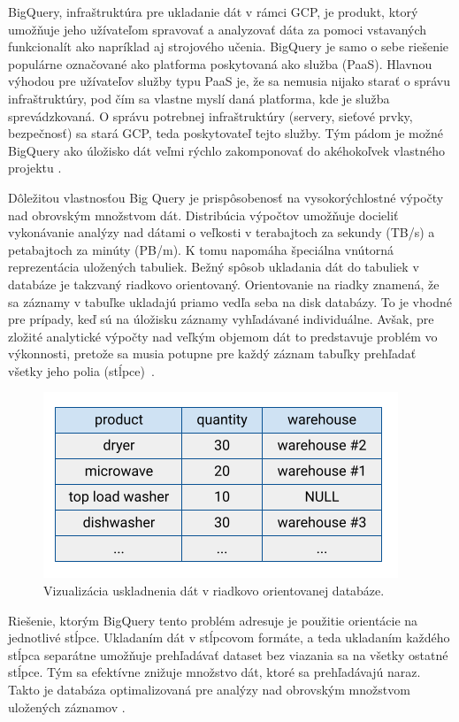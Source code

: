 BigQuery, infraštruktúra pre ukladanie dát v rámci GCP, je produkt, ktorý umožňuje jeho užívateľom spravovať a analyzovať dáta za pomoci vstavaných funkcionalít ako napríklad aj strojového učenia.
BigQuery je samo o sebe riešenie populárne označované ako platforma poskytovaná ako služba (PaaS).
Hlavnou výhodou pre užívateľov služby typu PaaS je, že sa nemusia nijako starať o správu infraštruktúry, pod čím sa vlastne myslí daná platforma, kde je služba sprevádzkovaná.
O správu potrebnej infraštruktúry (servery, sieťové prvky, bezpečnosť) sa stará GCP, teda poskytovateľ tejto služby.
Tým pádom je možné BigQuery ako úložisko dát veľmi rýchlo zakomponovať do akéhokoľvek vlastného projektu \cite{google-bq}.

Dôležitou vlastnosťou Big Query je prispôsobenosť na vysokorýchlostné výpočty nad obrovským množstvom dát.
Distribúcia výpočtov umožňuje docieliť vykonávanie analýzy nad dátami o veľkosti v terabajtoch za sekundy (TB/s) a petabajtoch za minúty (PB/m).
K tomu napomáha špeciálna vnútorná reprezentácia uložených tabuliek. 
Bežný spôsob ukladania dát do tabuliek v databáze je takzvaný riadkovo orientovaný.
Orientovanie na riadky znamená, že sa záznamy v tabuľke ukladajú priamo vedľa seba na disk databázy.
To je vhodné pre prípady, keď sú na úložisku záznamy vyhľadávané individuálne.
Avšak, pre zložité analytické výpočty nad veľkým objemom dát to predstavuje problém vo výkonnosti, pretože sa musia potupne pre každý záznam tabuľky prehľadať všetky jeho polia \mbox{(stĺpce) \cite{google-bq}}.

\begin{figure}[htb]
\begin{center}
 \includegraphics[scale=0.7]{obrazky-figures/row-oriented-store.png}
 \caption{\centering Vizualizácia uskladnenia dát v riadkovo orientovanej databáze.}
 \label{img:row-oriented-store}
\end{center}
\end{figure}

Riešenie, ktorým BigQuery tento problém adresuje je použitie orientácie na jednotlivé stĺpce. 
Ukladaním dát v stĺpcovom formáte, a teda ukladaním každého stĺpca separátne umožňuje prehľadávať dataset bez viazania sa na všetky ostatné stĺpce.
Tým sa efektívne znižuje množstvo dát, ktoré sa prehľadávajú naraz.
Takto je databáza optimalizovaná pre analýzy nad obrovským množstvom uložených záznamov \cite{google-bq}.

